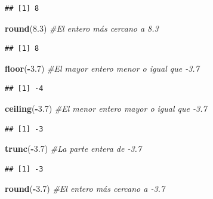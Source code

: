 \documentclass[]{book}
\newenvironment{Shaded}{\begin{snugshade}}{\end{snugshade}}
\newcommand{\CommentTok}[1]{\textcolor[rgb]{0.56,0.35,0.01}{\textit{#1}}}
\newcommand{\FloatTok}[1]{\textcolor[rgb]{0.00,0.00,0.81}{#1}}
\newcommand{\KeywordTok}[1]{\textcolor[rgb]{0.13,0.29,0.53}{\textbf{#1}}}
\newcommand{\NormalTok}[1]{#1}
\newcommand{\OperatorTok}[1]{\textcolor[rgb]{0.81,0.36,0.00}{\textbf{#1}}}
\theoremstyle{definition}
\theoremstyle{definition}
\theoremstyle{definition}
\theoremstyle{remark}
\begin{document}
\begin{verbatim}
## [1] 8
\end{verbatim}

\begin{Shaded}
\begin{Highlighting}[]
\KeywordTok{round}\NormalTok{(}\FloatTok{8.3}\NormalTok{) }\CommentTok{#El entero más cercano a 8.3}
\end{Highlighting}
\end{Shaded}

\begin{verbatim}
## [1] 8
\end{verbatim}

\begin{Shaded}
\begin{Highlighting}[]
\KeywordTok{floor}\NormalTok{(}\OperatorTok{-}\FloatTok{3.7}\NormalTok{) }\CommentTok{#El mayor entero menor o igual que -3.7}
\end{Highlighting}
\end{Shaded}

\begin{verbatim}
## [1] -4
\end{verbatim}

\begin{Shaded}
\begin{Highlighting}[]
\KeywordTok{ceiling}\NormalTok{(}\OperatorTok{-}\FloatTok{3.7}\NormalTok{) }\CommentTok{#El menor entero mayor o igual que -3.7}
\end{Highlighting}
\end{Shaded}

\begin{verbatim}
## [1] -3
\end{verbatim}

\begin{Shaded}
\begin{Highlighting}[]
\KeywordTok{trunc}\NormalTok{(}\OperatorTok{-}\FloatTok{3.7}\NormalTok{) }\CommentTok{#La parte entera de -3.7}
\end{Highlighting}
\end{Shaded}

\begin{verbatim}
## [1] -3
\end{verbatim}

\begin{Shaded}
\begin{Highlighting}[]
\KeywordTok{round}\NormalTok{(}\OperatorTok{-}\FloatTok{3.7}\NormalTok{) }\CommentTok{#El entero más cercano a -3.7}
\end{Highlighting}
\end{Shaded}
\end{document}
